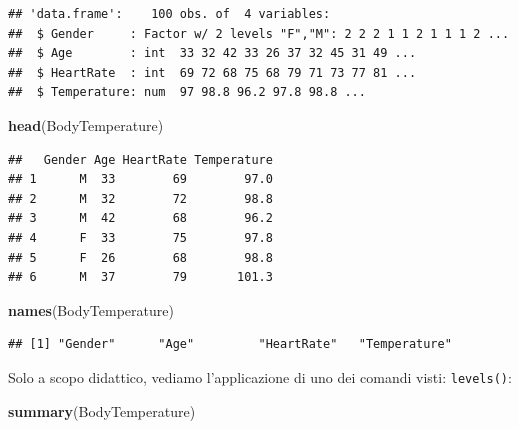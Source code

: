\documentclass[]{book}
\newenvironment{Shaded}{\begin{snugshade}}{\end{snugshade}}
\newcommand{\KeywordTok}[1]{\textcolor[rgb]{0.13,0.29,0.53}{\textbf{#1}}}
\newcommand{\NormalTok}[1]{#1}
\newcommand{\OperatorTok}[1]{\textcolor[rgb]{0.81,0.36,0.00}{\textbf{#1}}}
\newcommand{\StringTok}[1]{\textcolor[rgb]{0.31,0.60,0.02}{#1}}
\begin{document}
\begin{verbatim}
## 'data.frame':    100 obs. of  4 variables:
##  $ Gender     : Factor w/ 2 levels "F","M": 2 2 2 1 1 2 1 1 1 2 ...
##  $ Age        : int  33 32 42 33 26 37 32 45 31 49 ...
##  $ HeartRate  : int  69 72 68 75 68 79 71 73 77 81 ...
##  $ Temperature: num  97 98.8 96.2 97.8 98.8 ...
\end{verbatim}

\begin{Shaded}
\begin{Highlighting}[]
\KeywordTok{head}\NormalTok{(BodyTemperature)}
\end{Highlighting}
\end{Shaded}

\begin{verbatim}
##   Gender Age HeartRate Temperature
## 1      M  33        69        97.0
## 2      M  32        72        98.8
## 3      M  42        68        96.2
## 4      F  33        75        97.8
## 5      F  26        68        98.8
## 6      M  37        79       101.3
\end{verbatim}

\begin{Shaded}
\begin{Highlighting}[]
\KeywordTok{names}\NormalTok{(BodyTemperature)}
\end{Highlighting}
\end{Shaded}

\begin{verbatim}
## [1] "Gender"      "Age"         "HeartRate"   "Temperature"
\end{verbatim}

Solo a scopo didattico, vediamo l'applicazione di uno dei comandi visti: \texttt{levels()}:

\begin{Shaded}
\end{Shaded}

\begin{Shaded}
\begin{Highlighting}[]
\KeywordTok{summary}\NormalTok{(BodyTemperature)}
\end{Highlighting}
\end{Shaded}
\end{document}
